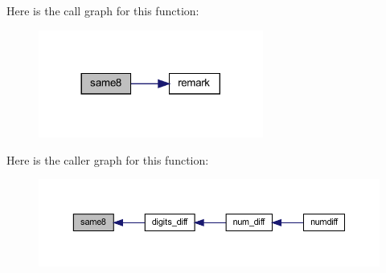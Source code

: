 Here is the call graph for this function\+:
\nopagebreak
\begin{figure}[H]
\begin{center}
\leavevmode
\includegraphics[width=209pt]{numdiff_8f90_ad61224828d0e9d4b998278d50ab4842f_cgraph}
\end{center}
\end{figure}
Here is the caller graph for this function\+:
\nopagebreak
\begin{figure}[H]
\begin{center}
\leavevmode
\includegraphics[width=350pt]{numdiff_8f90_ad61224828d0e9d4b998278d50ab4842f_icgraph}
\end{center}
\end{figure}
